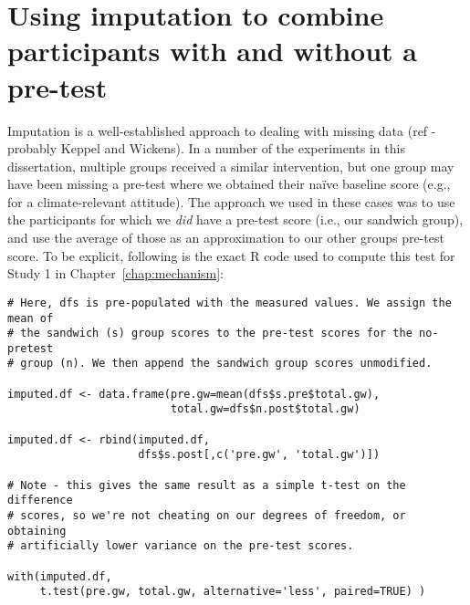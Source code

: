 \chapter{Using imputation to combine participants with and without a pre-test}
\label{app:imputation}

Imputation is a well-established approach to dealing with missing data (ref -
probably Keppel and Wickens). In a number of the experiments in this
dissertation, multiple groups received a similar intervention, but one group may
have been missing a pre-test where we obtained their na\"ive baseline score
(e.g., for a climate-relevant attitude). The approach we used in these cases was
to use the participants for which we \emph{did} have a pre-test score (i.e., our
sandwich group), and use the average of those as an approximation to our other
groups pre-test score. To be explicit, following is the exact R code used to
compute this test for Study 1 in Chapter~\ref{chap:mechanism}:

\begin{verbatim}
# Here, dfs is pre-populated with the measured values. We assign the mean of
# the sandwich (s) group scores to the pre-test scores for the no-pretest
# group (n). We then append the sandwich group scores unmodified.

imputed.df <- data.frame(pre.gw=mean(dfs$s.pre$total.gw),
                         total.gw=dfs$n.post$total.gw)

imputed.df <- rbind(imputed.df,
                    dfs$s.post[,c('pre.gw', 'total.gw')])

# Note - this gives the same result as a simple t-test on the difference
# scores, so we're not cheating on our degrees of freedom, or obtaining
# artificially lower variance on the pre-test scores.

with(imputed.df,
     t.test(pre.gw, total.gw, alternative='less', paired=TRUE) )
\end{verbatim}
